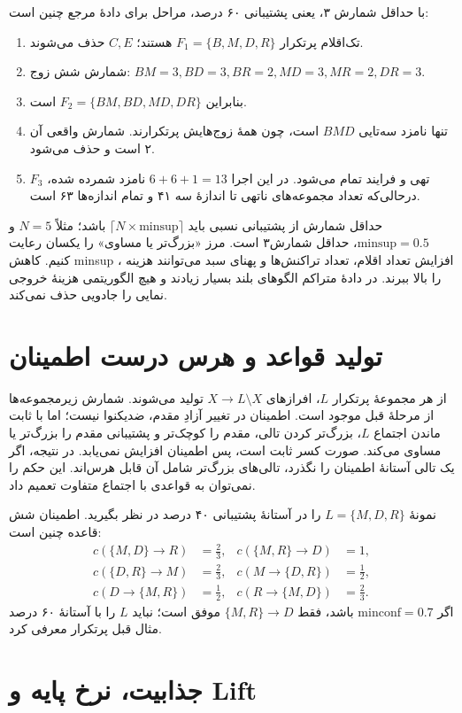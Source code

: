 با حداقل شمارش ۳، یعنی پشتیبانی ۶۰ درصد، مراحل برای دادهٔ مرجع چنین است:
\begin{enumerate}
\item تک‌اقلام پرتکرار $F_1=\{B,M,D,R\}$ هستند؛ $C,E$ حذف می‌شوند.
\item شمارش شش زوج: $BM=3,BD=3,BR=2,MD=3,MR=2,DR=3$.
\item بنابراین $F_2=\{BM,BD,MD,DR\}$ است.
\item تنها نامزد سه‌تایی $BMD$ است، چون همهٔ زوج‌هایش پرتکرارند. شمارش واقعی آن ۲ است و حذف می‌شود.
\item $F_3$ تهی و فرایند تمام می‌شود. در این اجرا $6+6+1=13$ نامزد شمرده شده، درحالی‌که تعداد مجموعه‌های ناتهی تا اندازهٔ سه ۴۱ و تمام اندازه‌ها ۶۳ است.
\end{enumerate}

حداقل شمارش از پشتیبانی نسبی باید $\lceil N\times\mathrm{minsup}\rceil$ باشد؛ مثلاً $N=5$ و $\mathrm{minsup}=0.5$، حداقل شمارش۳ است. مرز «بزرگ‌تر یا مساوی» را یکسان رعایت کنیم. کاهش minsup ، افزایش تعداد اقلام، تعداد تراکنش‌ها و پهنای سبد می‌توانند هزینه را بالا ببرند. در دادهٔ متراکم الگوهای بلند بسیار زیادند و هیچ الگوریتمی هزینهٔ خروجی نمایی را جادویی حذف نمی‌کند.

\section{تولید قواعد و هرس درست اطمینان}

از هر مجموعهٔ پرتکرار $L$، افرازهای $X\to L\setminus X$ تولید می‌شوند. شمارش زیرمجموعه‌ها از مرحلهٔ قبل موجود است. اطمینان در تغییر آزادِ مقدم، ضدیکنوا نیست؛ اما با ثابت ماندن اجتماع $L$، بزرگ‌تر کردن تالی، مقدم را کوچک‌تر و پشتیبانی مقدم را بزرگ‌تر یا مساوی می‌کند. صورت کسر ثابت است، پس اطمینان افزایش نمی‌یابد. در نتیجه، اگر یک تالی آستانهٔ اطمینان را نگذرد، تالی‌های بزرگ‌تر شامل آن قابل هرس‌اند. این حکم را نمی‌توان به قواعدی با اجتماع متفاوت تعمیم داد.

نمونهٔ $L=\{M,D,R\}$ را در آستانهٔ پشتیبانی ۴۰ درصد در نظر بگیرید. اطمینان شش قاعده چنین است:
\begin{align*}
c(\{M,D\}\to R)&=\frac23,& c(\{M,R\}\to D)&=1,\\
c(\{D,R\}\to M)&=\frac23,& c(M\to\{D,R\})&=\frac12,\\
c(D\to\{M,R\})&=\frac12,& c(R\to\{M,D\})&=\frac23.
\end{align*}
اگر $\mathrm{minconf}=0.7$ باشد، فقط $\{M,R\}\to D$ موفق است؛ نباید $L$ را با آستانهٔ ۶۰ درصد مثال قبل پرتکرار معرفی کرد.

\section{جذابیت، نرخ پایه و Lift}

